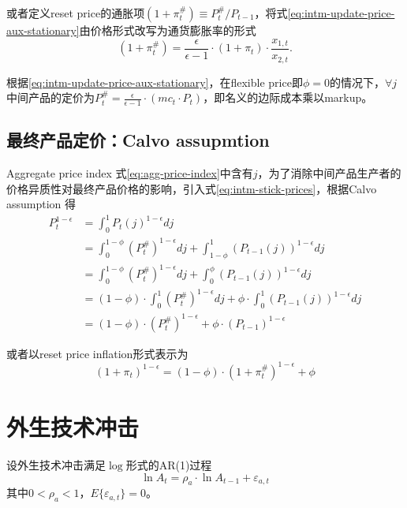 或者定义reset price的通胀项$(1+ \pi^{\#}_t) \equiv P^{\#}_t / P_{t-1}$，将式\eqref{eq:intm-update-price-aux-stationary}由价格形式改写为通货膨胀率的形式
\begin{equation}
  \label{eq:intm-update-inflation-aux}
  (1+\pi^{\#}_t) = \frac{\epsilon}{\epsilon -1} \cdot \left( 1+\pi_t \right) \cdot \frac{x_{1,t}}{x_{2,t}}.
\end{equation}

根据\eqref{eq:intm-update-price-aux-stationary}，在flexible price即$\phi =0$的情况下，$\forall j$ 中间产品的定价为$P^{\#}_t = \frac{\epsilon}{\epsilon -1} \cdot (mc_t \cdot P_t)$，即名义的边际成本乘以markup。


\subsection{最终产品定价：Calvo assupmtion}
\label{sec:final-produc-price}

Aggregate price index 式\eqref{eq:agg-price-index}中含有$j$，为了消除中间产品生产者的价格异质性对最终产品价格的影响，引入式\eqref{eq:intm-stick-prices}，根据Calvo assumption \citep{Calvo:1983uqa}得
\begin{align}
\label{eq:agg-price-index-noj}
  P_t^{1-\epsilon} &= \int_{0}^1 P_t(j)^{1-\epsilon} dj \nonumber\\
                   &= \int_{0}^{1-\phi} \left(P_t^{\#}\right)^{1-\epsilon} dj + \int_{1-\phi}^1 \left(P_{t-1}(j)\right)^{1-\epsilon} dj\nonumber\\
                   &= \int_{0}^{1-\phi} \left(P_t^{\#}\right)^{1-\epsilon} dj + \int_{0}^{\phi} \left(P_{t-1}(j)\right)^{1-\epsilon} dj\nonumber\\
                   &= (1-\phi) \cdot \int_{0}^{1} \left(P_t^{\#}\right)^{1-\epsilon} dj + \phi \cdot \int_{0}^1 \left(P_{t-1}(j)\right)^{1-\epsilon} dj \nonumber\\
                   &=(1-\phi) \cdot \left(P^{\#}_t\right)^{1-\epsilon} + \phi \cdot \left(P_{t-1}\right)^{1-\epsilon}
\end{align}

或者以reset price inflation形式表示为
\begin{equation}
  \label{eq:agg-inflation-index}
  \left(1+\pi_t\right)^{1-\epsilon} = (1-\phi) \cdot \left(1+\pi^{\#}_t\right)^{1-\epsilon} + \phi
\end{equation}

\section{外生技术冲击}
\label{sec:exo-prod-shock}
设外生技术冲击满足$\log$形式的AR(1)过程
\begin{equation}
  \label{eq:exo-prod-shock}
  \ln A_t = \rho_a \cdot \ln A_{t-1} + \varepsilon_{a,t}
\end{equation}
其中$0<\rho_a<1$，$E\{\varepsilon_{a,t}\}=0$。


